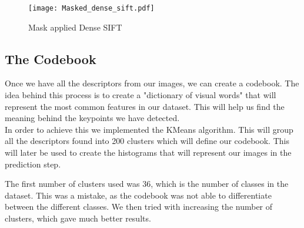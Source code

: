 \documentclass[9pt,a4paper,twoside]{tau-class/tau}
\begin{document}
    \begin{figure}[H]
		\centering
		\texttt{[image: Masked\_dense\_sift.pdf]}
		\caption{Mask applied Dense SIFT}
		\label{fig:finalsift}
	\end{figure}

    \subsection{The Codebook}

    Once we have all the descriptors from our images, we can create a codebook. The idea behind this process is to create a
    "dictionary of visual words" that will represent the most common features in our dataset. This will help us find the meaning
    behind the keypoints we have detected.\\

    In order to achieve this we implemented the KMeans algorithm. This will group all the descriptors found into 200 clusters
    which will define our codebook. This will later be used to create the histograms that will represent our images in the prediction step.


    \begin{info}
        The first number of clusters used was 36, which is the number of classes in the dataset. This was a mistake, as the codebook was not able to differentiate between the different classes. We then tried with increasing the number of clusters, which gave much better results.
    \end{info}

%	
%
%
%		
%			
%			
%
\end{document}
